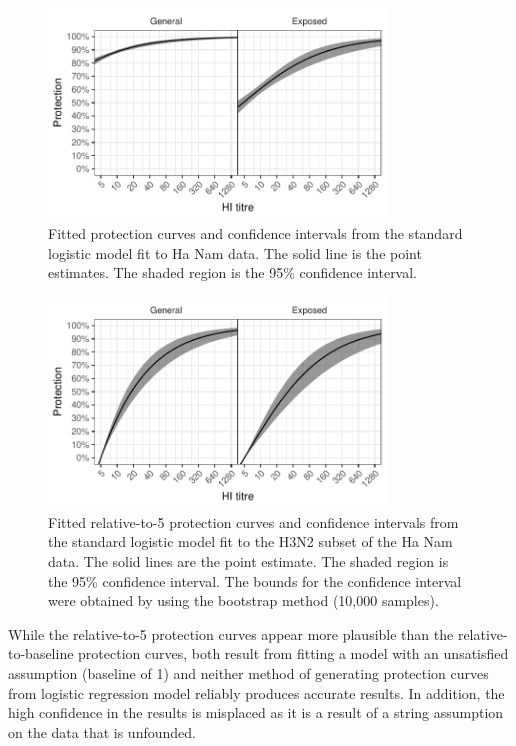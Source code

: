 \begin{figure}[htp]
    \centering
    \includegraphics[width=0.8\textwidth]{../fit-logistic-plot/hanam-h3-prot.pdf}
    \caption{
        Fitted protection curves and confidence intervals from the standard logistic model fit to Ha Nam data. The solid line is the point estimates. The shaded region is the 95\% confidence interval.
    }
    \label{fig:hanam-prot-lr}
\end{figure}

\begin{figure}[htp]
    \centering
    \includegraphics[width=0.8\textwidth]{../fit-logistic-boot-plot/hanam-h3-prot-rel.pdf}
    \caption{
        Fitted relative-to-5 protection curves and confidence intervals from the standard logistic model fit to the H3N2 subset of the Ha Nam data. The solid lines are the point estimate. The shaded region is the 95\% confidence interval. The bounds for the confidence interval were obtained by using the bootstrap method (10,000 samples).
    }
    \label{fig:hanam-prot-rel-lr-boot}
\end{figure}

While the relative-to-5 protection curves appear more plausible than the relative-to-baseline protection curves, both result from fitting a model with an unsatisfied assumption (baseline of 1) and neither method of generating protection curves from logistic regression model reliably produces accurate results. In addition, the high confidence in the results is misplaced as it is a result of a string assumption on the data that is unfounded.


